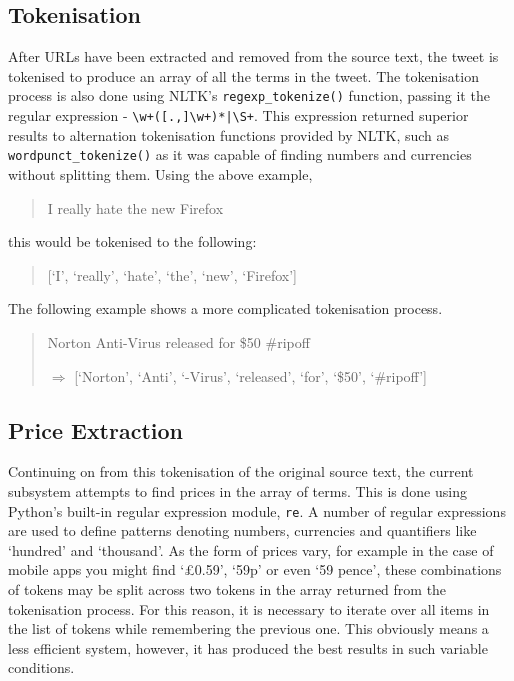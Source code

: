 \subsection{Tokenisation}
After URLs have been extracted and removed from the source text, the tweet is tokenised to produce an array of all the terms in the tweet. The tokenisation process is also done using NLTK's \texttt{regexp\_tokenize()} function, passing it the regular expression - \verb/\w+([.,]\w+)*|\S+/. This expression returned superior results to alternation tokenisation functions provided by NLTK, such as \texttt{wordpunct\_tokenize()} as it was capable of finding numbers and currencies without splitting them. Using the above example,

\begin{quote}
I really hate the new Firefox
\end{quote}
this would be tokenised to the following:
\begin{quote}
[`I', `really', `hate', `the', `new', `Firefox']
\end{quote}

The following example shows a more complicated tokenisation process.
\begin{quote}
Norton Anti-Virus released for \$50 \#ripoff

\begin{math}\Rightarrow\end{math}
[`Norton', `Anti', `-Virus', `released', `for', `\$50', `\#ripoff']
\end{quote}

\subsection{Price Extraction}
\label{sec:price}
Continuing on from this tokenisation of the original source text, the current subsystem attempts to find prices in the array of terms. This is done using Python's built-in regular expression module, \texttt{re}. A number of regular expressions are used to define patterns denoting numbers, currencies and quantifiers like `hundred' and `thousand'. As the form of prices vary, for example in the case of mobile apps you might find `£0.59', `59p' or even `59 pence', these combinations of tokens may be split across two tokens in the array returned from the tokenisation process. For this reason, it is necessary to iterate over all items in the list of tokens while remembering the previous one. This obviously means a less efficient system, however, it has produced the best results in such variable conditions.

